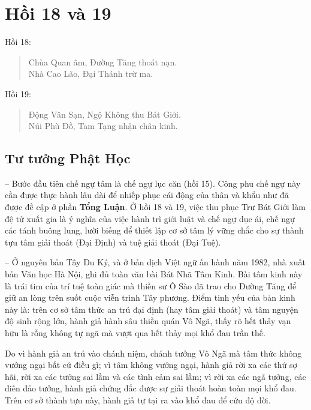 \chapter{Hồi 18 và 19} %
\label{cha:hoi_18_19}

Hồi 18:

\begin{verse}
\begin{itshape}
Chùa Quan âm, Đường Tăng thoát nạn.\\
Nhà Cao Lão, Đại Thánh trừ ma.
\end{itshape}
\end{verse}

Hồi 19:

\begin{verse}
\begin{itshape}
Động Vân Sạn, Ngộ Không thu Bát Giới.\\
Núi Phù Đồ, Tam Tạng nhận chân kinh.
\end{itshape}
\end{verse}

\section{Tư tưởng Phật Học} %
\label{sec:18_19_phat_hoc}

-- Bước đầu tiên chế ngự tâm là chế ngự lục căn (hồi 15). Công phu chế ngự này cần được thực hành lâu dài để nhiếp phục cái động của thân và khẩu như đã được đề cập ở phần {\bf Tổng Luận}. Ở hồi 18 và 19, việc thu phục Trư Bát Giới làm đệ tử xuất gia là ý nghĩa của việc hành trì giới luật và chế ngự dục ái, chế ngự các tánh buông lung, lười biếng để thiết lập cơ sở tâm lý vững chắc cho sự thành tựu tâm giải thoát (Đại Định) và tuệ giải thoát (Đại Tuệ).

-- Ở nguyên bản Tây Du Ký, và ở bản dịch Việt ngữ ấn hành năm 1982, nhà xuất bản Văn học Hà Nội, ghi đủ toàn văn bài Bát Nhã Tâm Kinh. Bài tâm kinh này là trái tim của trí tuệ toàn giác mà thiền sư Ô Sào đã trao cho Đường Tăng để giữ an lòng trên suốt cuộc viễn trình Tây phương. Điểm tinh yếu của bản kinh này là: trên cơ sở tâm thức an trú đại định (hay tâm giải thoát) và tâm nguyện độ sinh rộng lớn, hành giả hành sâu thiền quán Vô Ngã, thấy rõ hết thảy vạn hữu là rỗng không tự ngã mà vượt qua hết thảy mọi khổ đau trần thế.

Do vì hành giả an trú vào chánh niệm, chánh tưởng Vô Ngã mà tâm thức không vướng ngại bất cứ điều gì; vì tâm không vướng ngại, hành giả rời xa các thứ sợ hãi, rời xa các tưởng sai lầm và các tình cảm sai lầm; vì rời xa các ngã tưởng, các điên đảo tưởng, hành giả chứng đắc được sự giải thoát hoàn toàn mọi khổ đau. Trên cơ sở thành tựu này, hành giả tự tại ra vào khổ đau để cứu độ đời.


